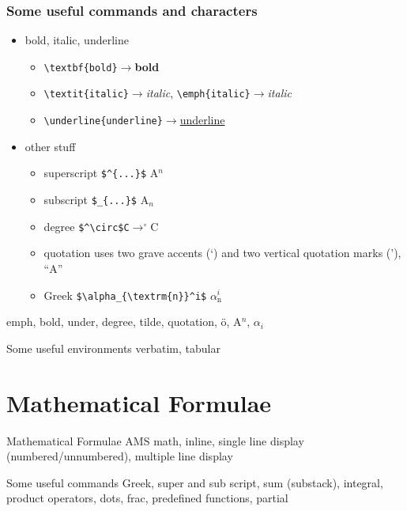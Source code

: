 \documentclass[11pt]{beamer}
\begin{document}
%
%
\begin{frame}[fragile]\frametitle{Some useful commands and characters}
\begin{itemize}
	\item bold, italic, underline
	\begin{itemize}
		\item \verb+\textbf{bold}+$\rightarrow$\textbf{bold}
		\item \verb+\textit{italic}+$\rightarrow$\textit{italic}, \verb+\emph{italic}+$\rightarrow$\emph{italic}
		\item \verb+\underline{underline}+$\rightarrow$\underline{underline}
	\end{itemize}
	\item other stuff
	\begin{itemize}
		\item superscript \verb+$^{...}$+ A$^{n}$
		\item subscript \verb+$_{...}$+ A$_{n}$
		\item degree  \verb+$^\circ$C+$\rightarrow^\circ$C
		\item quotation uses two grave accents (`) and two vertical quotation marks ('), ``A''
		\item Greek \verb+$\alpha_{\textrm{n}}^i$+ $\alpha_{\textrm{n}}^i$
	\end{itemize}
\end{itemize}
emph, bold, under, degree, tilde, quotation, \"{o}, A$^{n}$, $\alpha_i$
\end{frame}

%
%
\begin{frame}{Some useful environments}
verbatim, tabular
\end{frame}

%
%
\section{Mathematical Formulae}
\begin{frame}{Mathematical Formulae}
AMS math, inline, single line display (numbered/unnumbered), multiple line display
\end{frame}

%
%
\begin{frame}{Some useful commands}
Greek, super and sub script, sum (substack), integral, product operators, dots, frac, predefined functions, partial
\end{frame}
\end{document}
